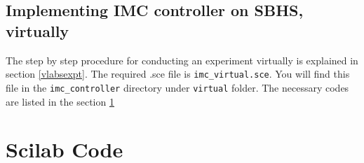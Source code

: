 \subsection{Implementing IMC controller on SBHS, virtually}
The step by step procedure for conducting an experiment virtually is explained in section \ref{vlabsexpt}. The required .sce file is {\tt imc\_virtual.sce}.  You will find this file in the {\tt imc\_controller} directory under {\tt virtual} folder. The necessary codes are listed in the section \ref{imccodes}


\section{Scilab Code}\label{imccodes}
\begin{code}

\end{code}

\begin{code}

\end{code}


\begin{code}

\end{code}


\begin{code}

\end{code}


% 
